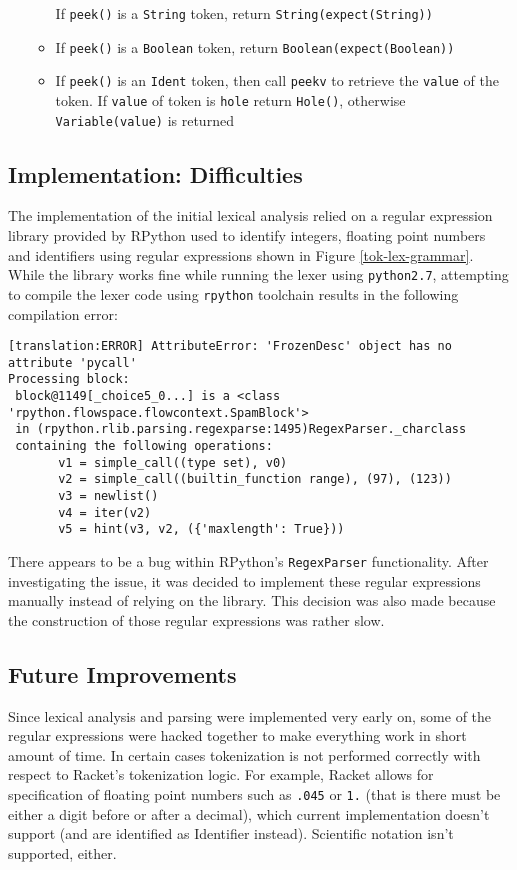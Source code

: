 \begin{itemize}
\begin{itemize}
		If \texttt{peek()} is a \texttt{String} token, return \texttt{String(expect(String))}
	\item
		If \texttt{peek()} is a \texttt{Boolean} token, return \texttt{Boolean(expect(Boolean))}
	\item

		If \texttt{peek()} is an \texttt{Ident} token, then call \texttt{peekv} to retrieve the \texttt{value} of the token. If \texttt{value} of token is \texttt{hole} return \texttt{Hole()}, otherwise \texttt{Variable(value)} is returned
	\end{itemize}
	

\end{itemize}

\subsection{Implementation: Difficulties}
The implementation of the initial lexical analysis relied on a regular expression library provided by RPython used to identify integers, floating point numbers and identifiers using regular expressions shown in Figure \ref{tok-lex-grammar}. While the library works fine while running the lexer using \texttt{python2.7}, attempting to compile the lexer code using \texttt{rpython} toolchain results in the following compilation error:

\begin{verbatim}
[translation:ERROR] AttributeError: 'FrozenDesc' object has no attribute 'pycall'
Processing block:
 block@1149[_choice5_0...] is a <class 'rpython.flowspace.flowcontext.SpamBlock'> 
 in (rpython.rlib.parsing.regexparse:1495)RegexParser._charclass 
 containing the following operations: 
       v1 = simple_call((type set), v0) 
       v2 = simple_call((builtin_function range), (97), (123)) 
       v3 = newlist() 
       v4 = iter(v2) 
       v5 = hint(v3, v2, ({'maxlength': True})) 
\end{verbatim}

There appears to be a bug within RPython's \texttt{RegexParser} functionality. After investigating the issue, it was decided to implement these regular expressions manually instead of relying on the library. This decision was also made because the construction of those regular expressions was rather slow.

\subsection{Future Improvements}

Since lexical analysis and parsing were implemented very early on, some of the regular expressions were hacked together to make everything work in short amount of time. In certain cases tokenization is not performed correctly with respect to Racket's tokenization logic. For example, Racket allows for specification of floating point numbers such as \texttt{.045} or \texttt{1.} (that is there must be either a digit before or after a decimal), which current implementation doesn't support (and are identified as Identifier instead). Scientific notation isn't supported, either.
